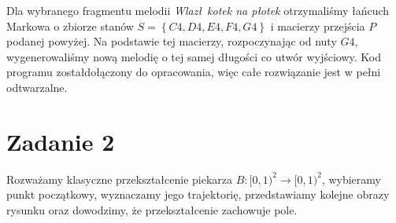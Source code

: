 \documentclass[11pt,a4paper]{article}
\newcommand{\set}[1]{\left\{ #1 \right\}}
\theoremstyle{plain}
\theoremstyle{definition}
\begin{document}
\begin{wynikbox}
Dla wybranego fragmentu melodii \emph{Wlaz\l\ kotek na p\l otek} otrzymali\'smy \l a\'ncuch Markowa
o zbiorze stan\'ow \(S=\set{C4,D4,E4,F4,G4}\) i macierzy przej\'scia \(P\) podanej powy\.zej.
Na podstawie tej macierzy, rozpoczynaj\k{a}c od nuty \(G4\), wygenerowali\'smy now\k{a} melodi\k{e}
o tej samej d\l ugo\'sci co utw\'or wyj\'sciowy. Kod programu zosta\l do\l \k{a}czony do opracowania,
wi\k{e}c ca\l e rozwi\k{a}zanie jest w pe\l ni odtwarzalne.
\end{wynikbox}

\section{Zadanie 2}

\begin{opisbox}
Rozwa\.zamy klasyczne przekszta\l cenie piekarza \(B \colon [0,1)^2 \to [0,1)^2\), wybieramy punkt
pocz\k{a}tkowy, wyznaczamy jego trajektori\k{e}, przedstawiamy kolejne obrazy rysunku oraz dowodzimy,
\.ze przekszta\l cenie zachowuje pole.
\end{opisbox}
\end{document}
